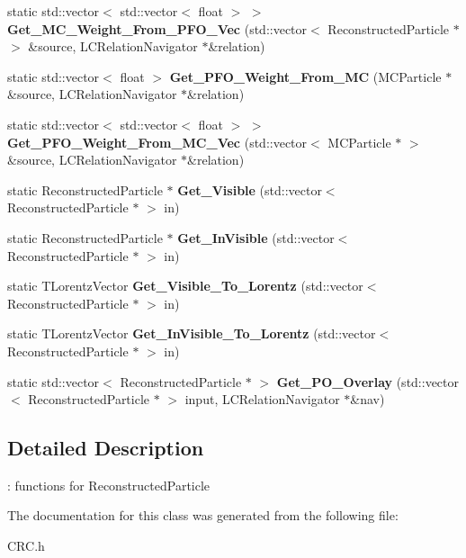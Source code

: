 \begin{DoxyCompactItemize}
\item 
\hypertarget{classToolSet_1_1CRC_aaaca6d608e731f498833598f0c611b34}{
static std::vector$<$ std::vector$<$ float $>$ $>$ {\bfseries Get\_\-MC\_\-Weight\_\-From\_\-PFO\_\-Vec} (std::vector$<$ ReconstructedParticle $\ast$ $>$ \&source, LCRelationNavigator $\ast$\&relation)}
\label{classToolSet_1_1CRC_aaaca6d608e731f498833598f0c611b34}

\item 
\hypertarget{classToolSet_1_1CRC_a384a4d9c72384db38104b6c67b7b6c5d}{
static std::vector$<$ float $>$ {\bfseries Get\_\-PFO\_\-Weight\_\-From\_\-MC} (MCParticle $\ast$\&source, LCRelationNavigator $\ast$\&relation)}
\label{classToolSet_1_1CRC_a384a4d9c72384db38104b6c67b7b6c5d}

\item 
\hypertarget{classToolSet_1_1CRC_acea8182f9deddac046a49604f3fba50b}{
static std::vector$<$ std::vector$<$ float $>$ $>$ {\bfseries Get\_\-PFO\_\-Weight\_\-From\_\-MC\_\-Vec} (std::vector$<$ MCParticle $\ast$ $>$ \&source, LCRelationNavigator $\ast$\&relation)}
\label{classToolSet_1_1CRC_acea8182f9deddac046a49604f3fba50b}

\item 
\hypertarget{classToolSet_1_1CRC_af665bae4e2dea9fbf8f131632ad60986}{
static ReconstructedParticle $\ast$ {\bfseries Get\_\-Visible} (std::vector$<$ ReconstructedParticle $\ast$ $>$ in)}
\label{classToolSet_1_1CRC_af665bae4e2dea9fbf8f131632ad60986}

\item 
\hypertarget{classToolSet_1_1CRC_a09784c243bc4cd8cefb18e00a1d8301f}{
static ReconstructedParticle $\ast$ {\bfseries Get\_\-InVisible} (std::vector$<$ ReconstructedParticle $\ast$ $>$ in)}
\label{classToolSet_1_1CRC_a09784c243bc4cd8cefb18e00a1d8301f}

\item 
\hypertarget{classToolSet_1_1CRC_a52f73ed2ca6accd9fc43f04d9d3cbbe1}{
static TLorentzVector {\bfseries Get\_\-Visible\_\-To\_\-Lorentz} (std::vector$<$ ReconstructedParticle $\ast$ $>$ in)}
\label{classToolSet_1_1CRC_a52f73ed2ca6accd9fc43f04d9d3cbbe1}

\item 
\hypertarget{classToolSet_1_1CRC_ad244840d5374b1773ed3f822d9411a5d}{
static TLorentzVector {\bfseries Get\_\-InVisible\_\-To\_\-Lorentz} (std::vector$<$ ReconstructedParticle $\ast$ $>$ in)}
\label{classToolSet_1_1CRC_ad244840d5374b1773ed3f822d9411a5d}

\item 
\hypertarget{classToolSet_1_1CRC_a4ebcccc808e546491c383b327bcc029d}{
static std::vector$<$ ReconstructedParticle $\ast$ $>$ {\bfseries Get\_\-PO\_\-Overlay} (std::vector$<$ ReconstructedParticle $\ast$ $>$ input, LCRelationNavigator $\ast$\&nav)}
\label{classToolSet_1_1CRC_a4ebcccc808e546491c383b327bcc029d}

\end{DoxyCompactItemize}


\subsection{Detailed Description}
: functions for ReconstructedParticle 

The documentation for this class was generated from the following file:\begin{DoxyCompactItemize}
\item 
CRC.h\end{DoxyCompactItemize}
